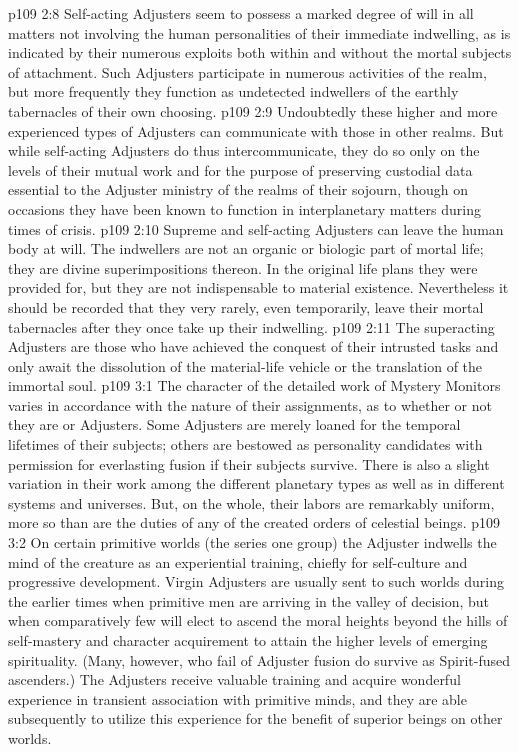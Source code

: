 \vs p109 2:8 \pc Self\hyp{}acting Adjusters seem to possess a marked degree of will in all matters not involving the human personalities of their immediate indwelling, as is indicated by their numerous exploits both within and without the mortal subjects of attachment. Such Adjusters participate in numerous activities of the realm, but more frequently they function as undetected indwellers of the earthly tabernacles of their own choosing.
\vs p109 2:9 Undoubtedly these higher and more experienced types of Adjusters can communicate with those in other realms. But while self\hyp{}acting Adjusters do thus intercommunicate, they do so only on the levels of their mutual work and for the purpose of preserving custodial data essential to the Adjuster ministry of the realms of their sojourn, though on occasions they have been known to function in interplanetary matters during times of crisis.
\vs p109 2:10 Supreme and self\hyp{}acting Adjusters can leave the human body at will. The indwellers are not an organic or biologic part of mortal life; they are divine superimpositions thereon. In the original life plans they were provided for, but they are not indispensable to material existence. Nevertheless it should be recorded that they very rarely, even temporarily, leave their mortal tabernacles after they once take up their indwelling.
\vs p109 2:11 The superacting Adjusters are those who have achieved the conquest of their intrusted tasks and only await the dissolution of the material\hyp{}life vehicle or the translation of the immortal soul.
\vs p109 3:1 The character of the detailed work of Mystery Monitors varies in accordance with the nature of their assignments, as to whether or not they are  or  Adjusters. Some Adjusters are merely loaned for the temporal lifetimes of their subjects; others are bestowed as personality candidates with permission for everlasting fusion if their subjects survive. There is also a slight variation in their work among the different planetary types as well as in different systems and universes. But, on the whole, their labors are remarkably uniform, more so than are the duties of any of the created orders of celestial beings.
\vs p109 3:2 On certain primitive worlds (the series one group) the Adjuster indwells the mind of the creature as an experiential training, chiefly for self\hyp{}culture and progressive development. Virgin Adjusters are usually sent to such worlds during the earlier times when primitive men are arriving in the valley of decision, but when comparatively few will elect to ascend the moral heights beyond the hills of self\hyp{}mastery and character acquirement to attain the higher levels of emerging spirituality. (Many, however, who fail of Adjuster fusion do survive as Spirit\hyp{}fused ascenders.) The Adjusters receive valuable training and acquire wonderful experience in transient association with primitive minds, and they are able subsequently to utilize this experience for the benefit of superior beings on other worlds. 
